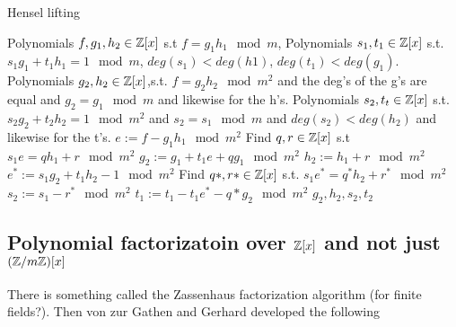 \begin{algorithm}                      
\caption{Hensel lifting}
\label{alg:HenselLifting}
\begin{algorithmic}                    
\REQUIRE Polynomials $f,g_1, h_2 \in\mathbb Z[x]$ s.t $f=g_1h_1 \mod m$,
\REQUIRE Polynomials $s_1, t_1 \in \mathbb Z[x]$ s.t. $s_1g_1 + t_1h_1 = 1 \mod m$, $deg(s_1) < deg(h1)$, $deg(t_1)<deg(g_1)$.
\ENSURE Polynomials $g_2, h_2 \in \mathbb Z[x]$,s.t. $f=g_2h_2 \mod m^2$ and the deg's of the g's are equal and $g_2 = g_1 \mod m$ and likewise for the h's.
\ENSURE Polynomials $s_2, t_t \in \mathbb Z[x]$ s.t. $s_2g_2 + t_2h_2 = 1 \mod m^2$ and $s_2 =s_1 \mod m$ and $deg(s_2) < deg(h_2)$ and likewise for the t's.
\STATE $e := f-g_1h_1 \mod m^2$
\STATE Find $q,r \in \mathbb Z[x]$ s.t $s_1e=qh_1 +r \mod m^2$
\STATE $g_2:=g_1 +t_1e+qg_1 \mod m^2$
\STATE $h_2 := h_1 + r \mod m^2$
\STATE $e^* := s_1g_2 + t_1h_2 -1 \mod m^2$
\STATE Find $q*, r* \in \mathbb Z[x]$ s.t. $s_1e^* = q^*h_2+r^* \mod m^2$
\STATE $s_2 := s_1 -r^* \mod m^2$
\STATE $t_1 := t_1 -t_1e^* -q*g_2 \mod m^2$
\RETURN $g_2, h_2, s_2, t_2$
\end{algorithmic}
\end{algorithm}


\subsection{Polynomial factorizatoin over $\mathbb Z[x]$ and not just $(\mathbb Z/m\mathbb Z)[x]$}

There is something called the Zassenhaus factorization algorithm (for finite fields?). Then von  zur Gathen and Gerhard developed the following


